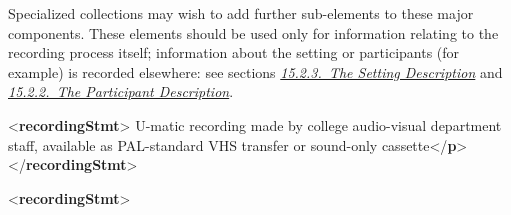 Specialized collections may wish to add further sub-elements to these major components. These elements should be used only for information relating to the recording process itself; information about the setting or participants (for example) is recorded elsewhere: see sections \textit{\hyperref[CCAHSE]{15.2.3.\ The Setting Description}} and \textit{\hyperref[CCAHPA]{15.2.2.\ The Participant Description}}. \par\bgroup{}\exampleFont \begin{shaded}\noindent\mbox{}{<\textbf{recordingStmt}>}\mbox{}\newline 
{}\mbox{}\newline 
\hspace*{1em}U-matic recording made by college audio-visual department staff,\mbox{}\newline 
\hspace*{1em}\hspace*{1em}\hspace*{1em}\hspace*{1em} available as PAL-standard VHS transfer or sound-only cassette{</\textbf{p}>}\mbox{}\newline 
{}\mbox{}\newline 
{</\textbf{recordingStmt}>}\end{shaded}\egroup\par \noindent  \par\bgroup{}\exampleFont \begin{shaded}\noindent\mbox{}{<\textbf{recordingStmt}>}\mbox{}\newline 
{}\mbox{}\newline 

\end{shaded}
